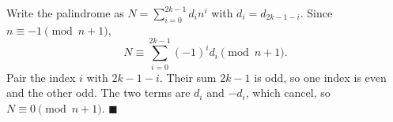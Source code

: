 Write the palindrome as $N=\displaystyle\sum_{i=0}^{2k-1}d_in^i$ with $d_i=d_{2k-1-i}$. Since $n\equiv-1\pmod{n+1}$,
\[N\equiv\sum_{i=0}^{2k-1}(-1)^id_i\pmod{n+1}.\]
Pair the index $i$ with $2k-1-i$. Their sum $2k-1$ is odd, so one index is even and the other odd. The two terms are $d_i$ and $-d_i$, which cancel, so $N\equiv0\pmod{n+1}$. $\blacksquare$
